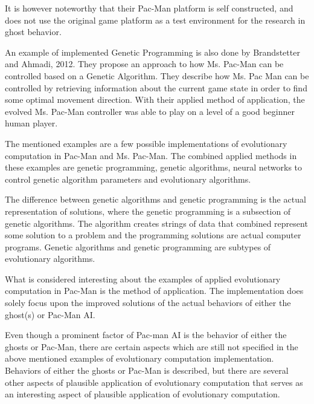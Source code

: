 It is however noteworthy that their Pac-Man platform is self constructed, and does not use the original game platform as a test environment for the research in ghost behavior.

An example of implemented Genetic Programming is also done by Brandstetter and Ahmadi, 2012. They propose an approach to how Ms. Pac-Man can be controlled based on a Genetic Algorithm.
They describe how Ms. Pac Man can be controlled by retrieving information about the current game state in order to find some optimal movement direction.
With their applied method of application, the evolved Ms. Pac-Man controller was able to play on a level of a good beginner human player. \cite{Brandstetter2012}

The mentioned examples are a few possible implementations of evolutionary computation in Pac-Man and Ms. Pac-Man. The combined applied methods in these examples are genetic programming, genetic algorithms, neural networks to control genetic algorithm parameters and evolutionary algorithms.

The difference between genetic algorithms and genetic programming is the actual representation of solutions, where the genetic programming is a subsection of genetic algorithms. The algorithm creates strings of data that combined represent some solution to a problem and the programming solutions are actual computer programs.\cite{genetic}
Genetic algorithms and genetic programming are subtypes of evolutionary algorithms.

What is considered interesting about the examples of applied evolutionary computation in Pac-Man is the method of application. The implementation does solely focus upon the improved solutions of the actual behaviors of either the ghost(s) or Pac-Man AI.

Even though a prominent factor of Pac-man AI is the behavior of either the ghosts or Pac-Man, there are certain aspects which are still not specified in the above mentioned examples of evolutionary computation implementation. Behaviors of either the ghosts or Pac-Man is described, but there are several other aspects of plausible application of evolutionary computation that serves as an interesting aspect of plausible application of evolutionary computation.